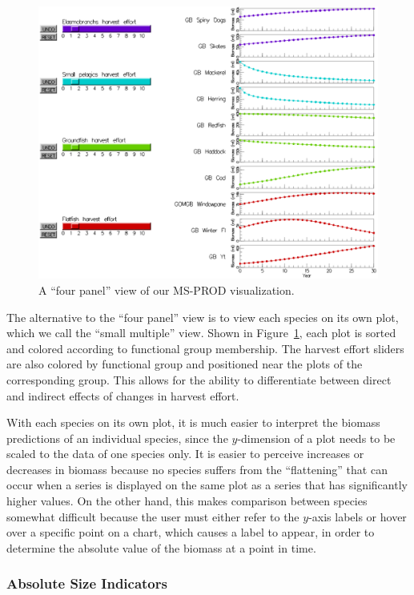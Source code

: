\begin{figure}[h]
	\centering
	\includegraphics[width=13cm]{figures/eps/msprod_species.eps}
	\caption{A ``four panel'' view of our MS-PROD visualization.}
	\label{fig:msprod_species}
\end{figure}

The alternative to the ``four panel'' view is to view each species on its own plot, which we call the ``small multiple'' view.  Shown in Figure~\ref{fig:msprod_species}, each plot is sorted and colored according to functional group membership.  The harvest effort sliders are also colored by functional group and positioned near the plots of the corresponding group.  This allows for the ability to differentiate between direct and indirect effects of changes in harvest effort.

With each species on its own plot, it is much easier to interpret the biomass predictions of an individual species, since the $y$-dimension of a plot needs to be scaled to the data of one species only.  It is easier to perceive increases or decreases in biomass because no species suffers from the ``flattening'' that can occur when a series is displayed on the same plot as a series that has significantly higher values.  On the other hand, this makes comparison between species somewhat difficult because the user must either refer to the $y$-axis labels or hover over a specific point on a chart, which causes a label to appear, in order to determine the absolute value of the biomass at a point in time.

\subsubsection{Absolute Size Indicators}


